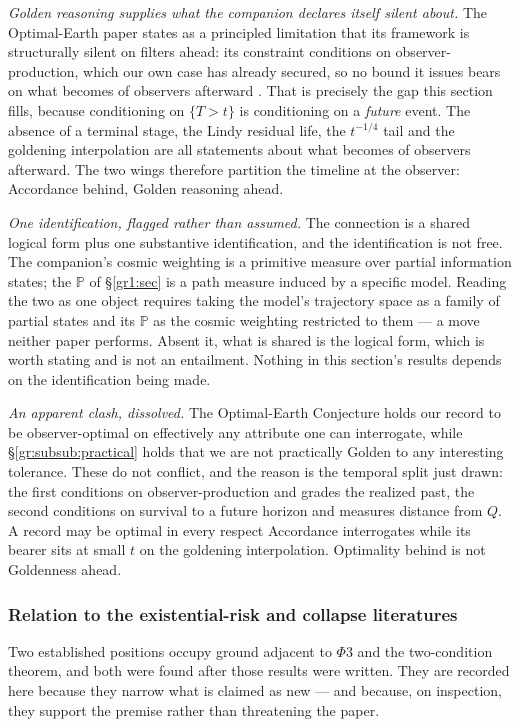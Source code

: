 \documentclass[11pt]{article}
\numberwithin{equation}{section}
\theoremstyle{plain}
\theoremstyle{definition}
\theoremstyle{remark}
\newcommand{\PP}{\mathbb{P}}
\begin{document}
\emph{Golden reasoning supplies what the companion declares itself
silent about.} The Optimal-Earth paper states as a principled limitation
that its framework is structurally silent on filters ahead: its
constraint conditions on observer-production, which our own case has
already secured, so no bound it issues bears on what becomes of
observers afterward \cite{Ben26Optimal}. That is precisely the gap this
section fills, because conditioning on $\{T>t\}$ is conditioning on a
\emph{future} event. The absence of a terminal stage, the Lindy residual
life, the $t^{-1/4}$ tail and the goldening interpolation are all
statements about what becomes of observers afterward. The two wings
therefore partition the timeline at the observer: Accordance behind,
Golden reasoning ahead.

\emph{One identification, flagged rather than assumed.} The connection
is a shared logical form plus one substantive identification, and the
identification is not free. The companion's cosmic weighting is a
primitive measure over partial information states; the $\PP$ of
\S\ref{gr1:sec} is a path measure induced by a
specific model. Reading the two as one object requires taking the
model's trajectory space as a family of partial states and its $\PP$ as
the cosmic weighting restricted to them --- a move neither paper
performs. Absent it, what is shared is the logical form, which is worth
stating and is not an entailment. Nothing in this section's results
depends on the identification being made.

\emph{An apparent clash, dissolved.} The Optimal-Earth Conjecture
\cite{Ben26Optimal} holds our record to be observer-optimal on
effectively any attribute one can interrogate, while \S\ref{gr:subsub:practical} holds
that we are not practically Golden to any interesting tolerance. These
do not conflict, and the reason is the temporal split just drawn: the
first conditions on observer-production and grades the realized past,
the second conditions on survival to a future horizon and measures
distance from $Q$. A record may be optimal in every respect Accordance
interrogates while its bearer sits at small $t$ on the goldening
interpolation. Optimality behind is not Goldenness ahead.

\subsubsection{Relation to the existential-risk and collapse
literatures}\label{gr:subsub:xrisk}

Two established positions occupy ground adjacent to $\Phi3$ and the
two-condition theorem, and both were found after those results were
written. They are recorded here because they narrow what is claimed as
new --- and because, on inspection, they support the premise rather than
threatening the paper.
\end{document}

